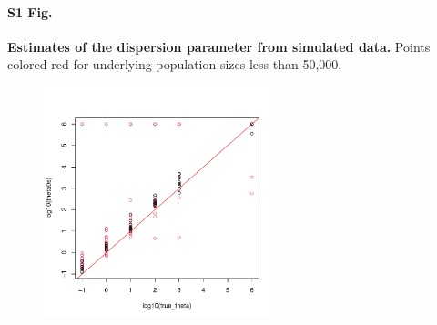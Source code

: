 \documentclass[10pt,letterpaper]{article}
\begin{document}
\paragraph*{S1 Fig.}
\label{S1_Fig}
{\bf Estimates of the dispersion parameter from simulated data.} Points colored red for underlying population sizes less than 50,000.
\begin{figure}[!h]
\includegraphics[width=0.6\textwidth]{thetaest_v_theta.pdf}
\label{S1}
\end{figure}




\end{document}
